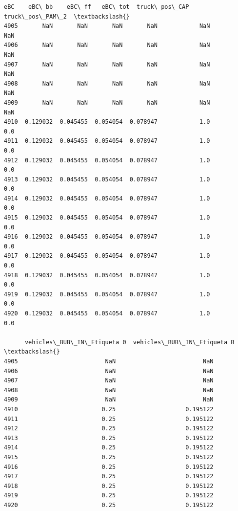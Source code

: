 \documentclass[11pt]{article}
\begin{document}
\begin{tcolorbox}[breakable, size=fbox, boxrule=.5pt, pad at break*=1mm, opacityfill=0]
\begin{Verbatim}[commandchars=\\\{\}]
           eBC    eBC\_bb    eBC\_ff   eBC\_tot  truck\_pos\_CAP  truck\_pos\_PAM\_2  \textbackslash{}
4905       NaN       NaN       NaN       NaN            NaN              NaN
4906       NaN       NaN       NaN       NaN            NaN              NaN
4907       NaN       NaN       NaN       NaN            NaN              NaN
4908       NaN       NaN       NaN       NaN            NaN              NaN
4909       NaN       NaN       NaN       NaN            NaN              NaN
4910  0.129032  0.045455  0.054054  0.078947            1.0              0.0
4911  0.129032  0.045455  0.054054  0.078947            1.0              0.0
4912  0.129032  0.045455  0.054054  0.078947            1.0              0.0
4913  0.129032  0.045455  0.054054  0.078947            1.0              0.0
4914  0.129032  0.045455  0.054054  0.078947            1.0              0.0
4915  0.129032  0.045455  0.054054  0.078947            1.0              0.0
4916  0.129032  0.045455  0.054054  0.078947            1.0              0.0
4917  0.129032  0.045455  0.054054  0.078947            1.0              0.0
4918  0.129032  0.045455  0.054054  0.078947            1.0              0.0
4919  0.129032  0.045455  0.054054  0.078947            1.0              0.0
4920  0.129032  0.045455  0.054054  0.078947            1.0              0.0

      vehicles\_BUB\_IN\_Etiqueta 0  vehicles\_BUB\_IN\_Etiqueta B  \textbackslash{}
4905                         NaN                         NaN
4906                         NaN                         NaN
4907                         NaN                         NaN
4908                         NaN                         NaN
4909                         NaN                         NaN
4910                        0.25                    0.195122
4911                        0.25                    0.195122
4912                        0.25                    0.195122
4913                        0.25                    0.195122
4914                        0.25                    0.195122
4915                        0.25                    0.195122
4916                        0.25                    0.195122
4917                        0.25                    0.195122
4918                        0.25                    0.195122
4919                        0.25                    0.195122
4920                        0.25                    0.195122


\end{Verbatim}
\end{tcolorbox}
\end{document}
